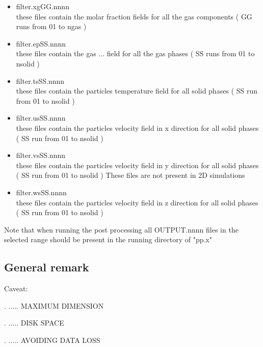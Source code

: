\begin{itemize}
\item filter.xgGG.nnnn \\
      these files contain the molar fraction fields for all the gas 
      components ( GG runs from 01 to ngas ) 

\item filter.epSS.nnnn \\
      these files contain the gas ... field for all the gas 
      phases ( SS runs from 01 to nsolid ) 

\item filter.tsSS.nnnn \\
      these files contain the particles temperature field 
      for all solid phases ( SS run from 01 to nsolid )

\item filter.usSS.nnnn \\
      these files contain the particles velocity field in x direction
      for all solid phases ( SS run from 01 to nsolid )

\item filter.vsSS.nnnn \\
      these files contain the particles velocity field in y direction
      for all solid phases ( SS run from 01 to nsolid )
      These files are not present in 2D simulations

\item filter.wsSS.nnnn \\
      these files contain the particles velocity field in z direction
      for all solid phases ( SS run from 01 to nsolid )


\end{itemize}

Note that when running the post processing all 
OUTPUT.nnnn files in the selected range should 
be present in the running directory of "pp.x"

\subsection{General remark}

\noindent Caveat:

. ..... MAXIMUM DIMENSION

. ..... DISK SPACE

. ..... AVOIDING DATA LOSS
